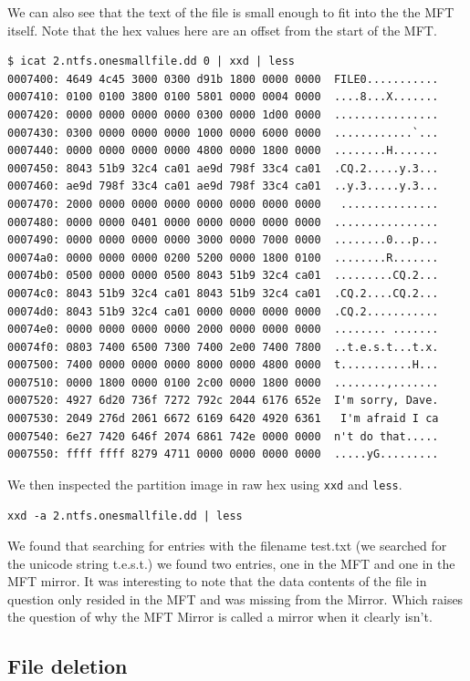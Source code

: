 \documentclass[a4paper,
    11pt,
    normalheadings,
    parindent,
    UKenglish,
    abstracton,
    ]{scrartcl}
\begin{document}
We can also see that the text of the file is small enough to fit into the the MFT itself. Note that the hex values here are an offset from the start of the MFT.
\begin{verbatim}
$ icat 2.ntfs.onesmallfile.dd 0 | xxd | less
0007400: 4649 4c45 3000 0300 d91b 1800 0000 0000  FILE0...........
0007410: 0100 0100 3800 0100 5801 0000 0004 0000  ....8...X.......
0007420: 0000 0000 0000 0000 0300 0000 1d00 0000  ................
0007430: 0300 0000 0000 0000 1000 0000 6000 0000  ............`...
0007440: 0000 0000 0000 0000 4800 0000 1800 0000  ........H.......
0007450: 8043 51b9 32c4 ca01 ae9d 798f 33c4 ca01  .CQ.2.....y.3...
0007460: ae9d 798f 33c4 ca01 ae9d 798f 33c4 ca01  ..y.3.....y.3...
0007470: 2000 0000 0000 0000 0000 0000 0000 0000   ...............
0007480: 0000 0000 0401 0000 0000 0000 0000 0000  ................
0007490: 0000 0000 0000 0000 3000 0000 7000 0000  ........0...p...
00074a0: 0000 0000 0000 0200 5200 0000 1800 0100  ........R.......
00074b0: 0500 0000 0000 0500 8043 51b9 32c4 ca01  .........CQ.2...
00074c0: 8043 51b9 32c4 ca01 8043 51b9 32c4 ca01  .CQ.2....CQ.2...
00074d0: 8043 51b9 32c4 ca01 0000 0000 0000 0000  .CQ.2...........
00074e0: 0000 0000 0000 0000 2000 0000 0000 0000  ........ .......
00074f0: 0803 7400 6500 7300 7400 2e00 7400 7800  ..t.e.s.t...t.x.
0007500: 7400 0000 0000 0000 8000 0000 4800 0000  t...........H...
0007510: 0000 1800 0000 0100 2c00 0000 1800 0000  ........,.......
0007520: 4927 6d20 736f 7272 792c 2044 6176 652e  I'm sorry, Dave.
0007530: 2049 276d 2061 6672 6169 6420 4920 6361   I'm afraid I ca
0007540: 6e27 7420 646f 2074 6861 742e 0000 0000  n't do that.....
0007550: ffff ffff 8279 4711 0000 0000 0000 0000  .....yG.........
\end{verbatim}


We then inspected the partition image in raw hex using \texttt{xxd} and \texttt{less}.
\begin{verbatim}
xxd -a 2.ntfs.onesmallfile.dd | less
\end{verbatim}
We found that searching for entries with the filename test.txt (we searched for the unicode string t.e.s.t.) we found two entries, one in the MFT and one in the MFT mirror. It was interesting to note that the data contents of the file in question only resided in the MFT and was missing from the Mirror. Which raises the question of why the MFT Mirror is called a mirror when it clearly isn't.



\subsection{File deletion}
\end{document}

